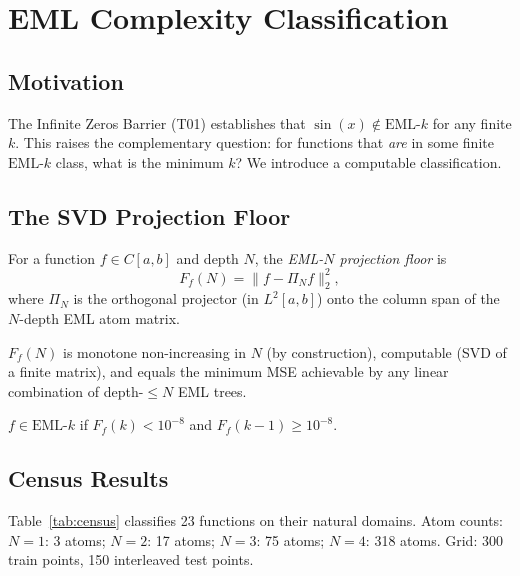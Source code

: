
\section{EML Complexity Classification}
\label{sec:complexity}

\subsection{Motivation}

The Infinite Zeros Barrier (T01) establishes that $\sin(x) \notin \mathrm{EML}\text{-}k$
for any finite $k$. This raises the complementary question: for functions
that \emph{are} in some finite $\mathrm{EML}\text{-}k$ class, what is the
minimum $k$?  We introduce a computable classification.

\subsection{The SVD Projection Floor}

\begin{definition}
For a function $f \in C[a,b]$ and depth $N$, the \emph{EML-$N$ projection floor} is
\[
  F_f(N) = \|f - \Pi_N f\|_2^2,
\]
where $\Pi_N$ is the orthogonal projector (in $L^2[a,b]$) onto the
column span of the $N$-depth EML atom matrix.
\end{definition}

$F_f(N)$ is monotone non-increasing in $N$ (by construction),
computable (SVD of a finite matrix), and equals the minimum MSE
achievable by any linear combination of depth-$\leq N$ EML trees.

\begin{definition}
$f \in \mathrm{EML}\text{-}k$ if $F_f(k) < 10^{-8}$ and $F_f(k-1) \geq 10^{-8}$.
\end{definition}

\subsection{Census Results}

Table~\ref{tab:census} classifies 23 functions on their natural domains.
Atom counts: $N=1$: 3 atoms; $N=2$: 17 atoms; $N=3$: 75 atoms; $N=4$: 318 atoms.
Grid: 300 train points, 150 interleaved test points.

